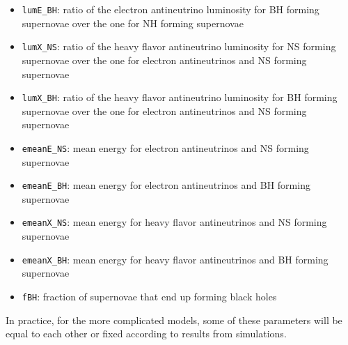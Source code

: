 \documentclass[12pt]{article}
\begin{document}
\begin{itemize}
            \begin{itemize}
                \item[] \texttt{lumE\_BH}: ratio of the electron antineutrino luminosity for BH forming supernovae over the one for NH forming supernovae 
                \item[] \texttt{lumX\_NS}: ratio of the heavy flavor antineutrino luminosity for NS forming supernovae over the one for electron antineutrinos and NS forming supernovae
                \item[] \texttt{lumX\_BH}: ratio of the heavy flavor antineutrino luminosity for BH forming supernovae over the one for electron antineutrinos and NS forming supernovae
                \item[] \texttt{emeanE\_NS}: mean energy for electron antineutrinos and NS forming supernovae
                \item[] \texttt{emeanE\_BH}: mean energy for electron antineutrinos and BH forming supernovae
                \item[] \texttt{emeanX\_NS}: mean energy for heavy flavor antineutrinos and NS forming supernovae
                \item[] \texttt{emeanX\_BH}: mean energy for heavy flavor antineutrinos and BH forming supernovae
                \item[] \texttt{fBH}: fraction of supernovae that end up forming black holes
            \end{itemize}
    \end{itemize}
    In practice, for the more complicated models, some of these parameters will be equal to each other or fixed according to results from simulations.
\end{document}
